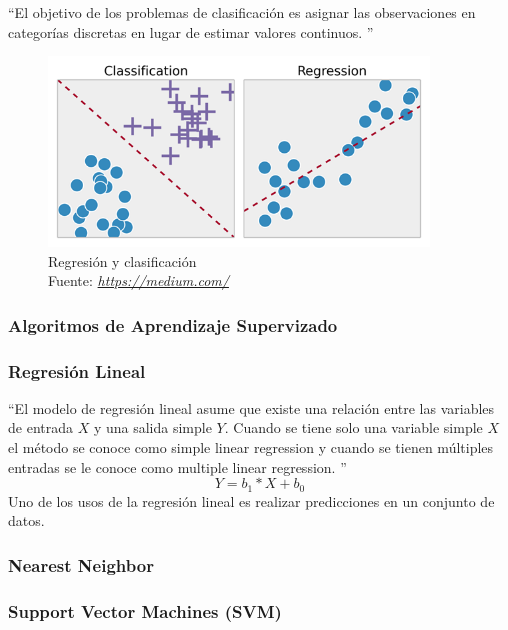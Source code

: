 \textquotedblleft El objetivo de los problemas de clasificación es asignar las observaciones en categorías discretas en lugar de estimar valores continuos. \textquotedblright \cite{WEBSITE:1}


\begin{figure}[H]
	\centering
	\includegraphics[width=0.9\textwidth]{Figures/regreclas.png}
	\caption{Regresión y clasificación \\ Fuente:  \href{https://medium.com/deep-math-machine-learning-ai/different-types-of-machine-learning-and-their-types-34760b9128a2}{\textit{https://medium.com/}}}
	\label{Regresion}
\end{figure} 

\subsubsection*{Algoritmos de Aprendizaje Supervizado}
\subsubsection*{Regresión Lineal}
\textquotedblleft El modelo de regresión lineal asume que existe una relación entre las variables de entrada $X$ y una salida simple $Y$.  Cuando se tiene solo una variable simple $X$ el método se conoce como simple linear regression y cuando se tienen múltiples entradas se le conoce como multiple linear regression.  \textquotedblright \cite{WEBSITE:3}
\begin{equation}
\label{Simple learning regression}
Y=b_{1}*X+b_{0}
\end{equation} 
Uno de los usos de la regresión lineal es realizar predicciones en un conjunto de datos.
\subsubsection*{Nearest Neighbor}

\subsubsection*{Support Vector Machines (SVM)}

